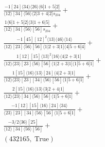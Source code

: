 \documentclass[varwidth, border=5pt]{standalone}
\begin{document}
\begin{my}
$\begin{gathered}
\scriptscriptstyle\frac{-1[24]⟨34⟩⟨26⟩⟨6|1+5|2]}{⟨12⟩[34]⟨56⟩⟨2|3+4|2]s_{234}}+\\
\scriptscriptstyle\frac{1⟨6|1+5|2]⟨3|1+6|5]}{⟨12⟩[34]⟨56⟩[56]s_{234}}+\\
\scriptscriptstyle\frac{-1[45][12]^2⟨13⟩⟨46⟩⟨14⟩}{⟨12⟩[23]⟨56⟩[56]⟨1|2+3|1]⟨4|5+6|4]}+\\
\scriptscriptstyle\frac{1[12][15]⟨13⟩^2⟨16⟩⟨4|2+3|1]}{⟨12⟩⟨23⟩[23]⟨56⟩[56]⟨1|2+3|1]⟨1|5+6|1]}+\\
\scriptscriptstyle\frac{1[15]⟨16⟩⟨13⟩[24]⟨4|2+3|1]}{⟨12⟩⟨23⟩[23][34]⟨56⟩[56]⟨1|5+6|1]}+\\
\scriptscriptstyle\frac{2[15]⟨16⟩⟨13⟩⟨3|2+4|1]}{⟨12⟩⟨23⟩[34]⟨56⟩[56]⟨1|5+6|1]}+\\
\scriptscriptstyle\frac{-1[12][15]⟨16⟩[24]⟨34⟩}{⟨23⟩[23][34]⟨56⟩[56]⟨1|5+6|1]}+\\
\scriptscriptstyle\frac{-3/2⟨36⟩[25]}{⟨12⟩[34]⟨56⟩[56]}+\\
\scriptscriptstyle(432165,\;\text{True})\phantom{+}
\end{gathered}$
\end{my}
\end{document}
